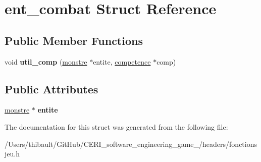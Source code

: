 \hypertarget{structent__combat}{}\section{ent\+\_\+combat Struct Reference}
\label{structent__combat}
\subsection*{Public Member Functions}
\begin{DoxyCompactItemize}
\item 
\mbox{\label{structent__combat_a989cb7e101ac452a9c35270638acbdad}} 
void {\bfseries util\+\_\+comp} (\hyperlink{classmonstre}{monstre} $\ast$entite, \hyperlink{classcompetence}{competence} $\ast$comp)
\end{DoxyCompactItemize}
\subsection*{Public Attributes}
\begin{DoxyCompactItemize}
\item 
\mbox{\label{structent__combat_aa450230df7ac3842bfbd5805626017cb}} 
\hyperlink{classmonstre}{monstre} $\ast$ {\bfseries entite}
\end{DoxyCompactItemize}


The documentation for this struct was generated from the following file\+:\begin{DoxyCompactItemize}
\item 
/\+Users/thibault/\+Git\+Hub/\+C\+E\+R\+I\+\_\+software\+\_\+engineering\+\_\+game\+\_/headers/fonctionsjeu.\+h\end{DoxyCompactItemize}

